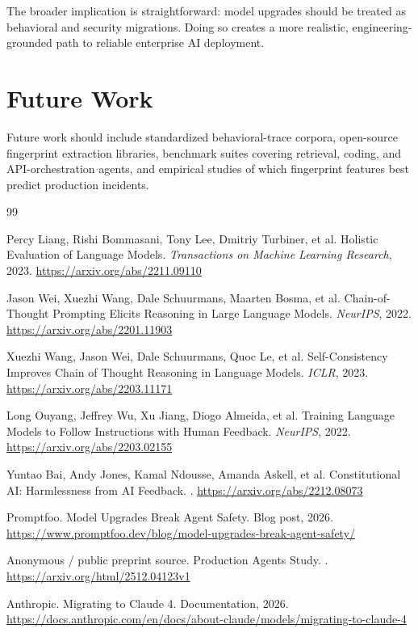 \documentclass[11pt]{article}
\begin{document}
The broader implication is straightforward: model upgrades should be treated as behavioral and security migrations. Doing so creates a more realistic, engineering-grounded path to reliable enterprise AI deployment.

\section*{Future Work}
Future work should include standardized behavioral-trace corpora, open-source fingerprint extraction libraries, benchmark suites covering retrieval, coding, and API-orchestration agents, and empirical studies of which fingerprint features best predict production incidents.

\begin{thebibliography}{99}

Percy Liang, Rishi Bommasani, Tony Lee, Dmitriy Turbiner, et al.
\newblock Holistic Evaluation of Language Models.
\newblock \emph{Transactions on Machine Learning Research}, 2023.
\newblock \url{https://arxiv.org/abs/2211.09110}

Jason Wei, Xuezhi Wang, Dale Schuurmans, Maarten Bosma, et al.
\newblock Chain-of-Thought Prompting Elicits Reasoning in Large Language Models.
\newblock \emph{NeurIPS}, 2022.
\newblock \url{https://arxiv.org/abs/2201.11903}

Xuezhi Wang, Jason Wei, Dale Schuurmans, Quoc Le, et al.
\newblock Self-Consistency Improves Chain of Thought Reasoning in Language Models.
\newblock \emph{ICLR}, 2023.
\newblock \url{https://arxiv.org/abs/2203.11171}

Long Ouyang, Jeffrey Wu, Xu Jiang, Diogo Almeida, et al.
\newblock Training Language Models to Follow Instructions with Human Feedback.
\newblock \emph{NeurIPS}, 2022.
\newblock \url{https://arxiv.org/abs/2203.02155}

Yuntao Bai, Andy Jones, Kamal Ndousse, Amanda Askell, et al.
\newblock Constitutional AI: Harmlessness from AI Feedback.
.
\newblock \url{https://arxiv.org/abs/2212.08073}

Promptfoo.
\newblock Model Upgrades Break Agent Safety.
\newblock Blog post, 2026.
\newblock \url{https://www.promptfoo.dev/blog/model-upgrades-break-agent-safety/}

Anonymous / public preprint source.
\newblock Production Agents Study.
.
\newblock \url{https://arxiv.org/html/2512.04123v1}

Anthropic.
\newblock Migrating to Claude 4.
\newblock Documentation, 2026.
\newblock \url{https://docs.anthropic.com/en/docs/about-claude/models/migrating-to-claude-4}

\end{thebibliography}
\end{document}

